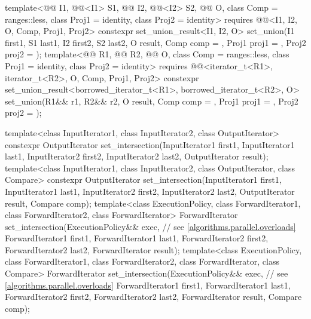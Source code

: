 \begin{codeblock}
{{    template<@@ I1, @@<I1> S1, @@ I2, @@<I2> S2,
             @@ O, class Comp = ranges::less,
             class Proj1 = identity, class Proj2 = identity>
      requires @@<I1, I2, O, Comp, Proj1, Proj2>
      constexpr set_union_result<I1, I2, O>
        set_union(I1 first1, S1 last1, I2 first2, S2 last2, O result, Comp comp = {},
                  Proj1 proj1 = {}, Proj2 proj2 = {});
    template<@@ R1, @@ R2, @@ O,
             class Comp = ranges::less, class Proj1 = identity, class Proj2 = identity>
      requires @@<iterator_t<R1>, iterator_t<R2>, O, Comp, Proj1, Proj2>
      constexpr set_union_result<borrowed_iterator_t<R1>, borrowed_iterator_t<R2>, O>
        set_union(R1&& r1, R2&& r2, O result, Comp comp = {},
                  Proj1 proj1 = {}, Proj2 proj2 = {});
  }

  template<class InputIterator1, class InputIterator2, class OutputIterator>
    constexpr OutputIterator
      set_intersection(InputIterator1 first1, InputIterator1 last1,
                       InputIterator2 first2, InputIterator2 last2,
                       OutputIterator result);
  template<class InputIterator1, class InputIterator2, class OutputIterator, class Compare>
    constexpr OutputIterator
      set_intersection(InputIterator1 first1, InputIterator1 last1,
                       InputIterator2 first2, InputIterator2 last2,
                       OutputIterator result, Compare comp);
  template<class ExecutionPolicy, class ForwardIterator1, class ForwardIterator2,
           class ForwardIterator>
    ForwardIterator
      set_intersection(ExecutionPolicy&& exec,                  // see \ref{algorithms.parallel.overloads}
                       ForwardIterator1 first1, ForwardIterator1 last1,
                       ForwardIterator2 first2, ForwardIterator2 last2,
                       ForwardIterator result);
  template<class ExecutionPolicy, class ForwardIterator1, class ForwardIterator2,
           class ForwardIterator, class Compare>
    ForwardIterator
      set_intersection(ExecutionPolicy&& exec,                  // see \ref{algorithms.parallel.overloads}
                       ForwardIterator1 first1, ForwardIterator1 last1,
                       ForwardIterator2 first2, ForwardIterator2 last2,
                       ForwardIterator result, Compare comp);

}
\end{codeblock}
